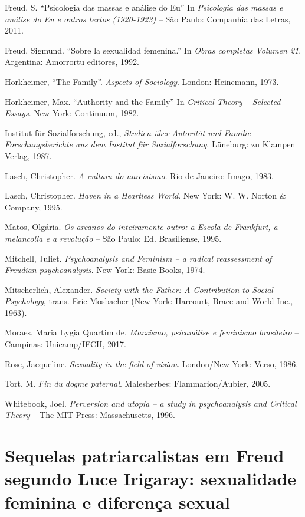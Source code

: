 Freud, S. ``Psicologia das massas e análise do Eu'' In
\emph{Psicologia das massas e análise do Eu e outros textos (1920-1923)}
-- São Paulo: Companhia das Letras, 2011.

Freud, Sigmund. ``Sobre la sexualidad femenina.'' In \emph{Obras
completas Volumen 21}. Argentina: Amorrortu editores, 1992.

Horkheimer, ``The Family''. \emph{Aspects of Sociology}. London:
Heinemann, 1973.

Horkheimer, Max. ``Authority and the Family'' In \emph{Critical Theory
-- Selected Essays}. New York: Continuum, 1982.

Institut für Sozialforschung, ed., \emph{Studien über Autorität und
Familie - Forschungsberichte aus dem Institut für Sozialforschung}.
Lüneburg: zu Klampen Verlag, 1987.

Lasch, Christopher. \emph{A cultura do narcisismo}. Rio de Janeiro:
Imago, 1983.

Lasch, Christopher. \emph{Haven in a Heartless World}. New York: W. W.
Norton \& Company, 1995.

Matos, Olgária. \emph{Os arcanos do inteiramente outro: a Escola de
Frankfurt, a melancolia e a revolução} -- São Paulo: Ed. Brasiliense,
1995.

Mitchell, Juliet. \emph{Psychoanalysis and Feminism -- a radical
reassessment of Freudian psychoanalysis}. New York: Basic Books, 1974.

Mitscherlich, Alexander. \emph{Society with the Father: A Contribution
to Social Psychology}, trans. Eric Mosbacher (New York: Harcourt, Brace
and World Inc., 1963).

Moraes, Maria Lygia Quartim de. \emph{Marxismo, psicanálise e
feminismo brasileiro} -- Campinas: Unicamp/IFCH, 2017.

Rose, Jacqueline. \emph{Sexuality in the field of vision}. London/New
York: Verso, 1986.

Tort, M. \emph{Fin du dogme paternal}. Malesherbes: Flammarion/Aubier,
2005.

Whitebook, Joel. \emph{Perversion and utopia -- a study in
psychoanalysis and Critical Theory} -- The MIT Press: Massachusetts,
1996.


\chapter*{Sequelas patriarcalistas em Freud segundo Luce Irigaray:
sexualidade feminina e diferença sexual}


